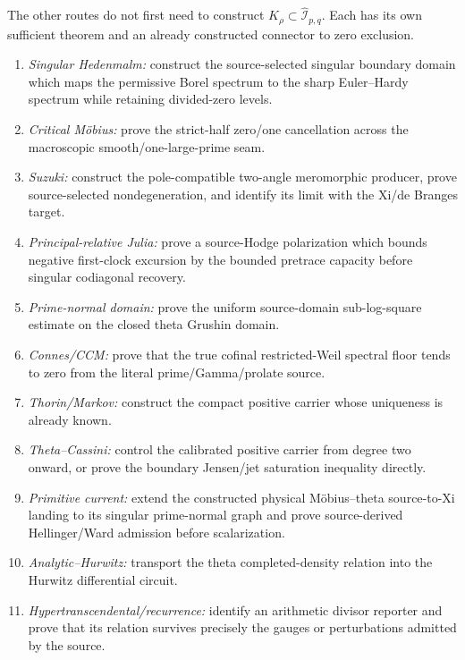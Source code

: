 \documentclass[11pt]{article}
\theoremstyle{definition}
\theoremstyle{remark}
\newcommand{\cI}{\mathcal I}
\begin{document}
The other routes do not first need to construct
\(K_\rho\subset\widehat{\cI}_{p,q}\).  Each has its own sufficient theorem
and an already constructed connector to zero exclusion.
\begin{enumerate}[leftmargin=2.2em]
\item \emph{Singular Hedenmalm:} construct the source-selected singular
      boundary domain which maps the permissive Borel spectrum to the
      sharp Euler--Hardy spectrum while retaining divided-zero levels.
\item \emph{Critical M\"obius:} prove the strict-half zero/one cancellation
      across the macroscopic smooth/one-large-prime seam.
\item \emph{Suzuki:} construct the pole-compatible two-angle meromorphic
      producer, prove source-selected nondegeneration, and identify its
      limit with the Xi/de Branges target.
\item \emph{Principal-relative Julia:} prove a source-Hodge polarization
      which bounds negative first-clock excursion by the bounded pretrace
      capacity before singular codiagonal recovery.
\item \emph{Prime-normal domain:} prove the uniform source-domain
      sub-log-square estimate on the closed theta Grushin domain.
\item \emph{Connes/CCM:} prove that the true cofinal restricted-Weil
      spectral floor tends to zero from the literal prime/Gamma/prolate
      source.
\item \emph{Thorin/Markov:} construct the compact positive carrier whose
      uniqueness is already known.
\item \emph{Theta--Cassini:} control the calibrated positive carrier from
      degree two onward, or prove the boundary Jensen/jet saturation
      inequality directly.
\item \emph{Primitive current:} extend the constructed physical
      M\"obius--theta source-to-Xi landing to its singular prime-normal
      graph and prove source-derived Hellinger/Ward admission before
      scalarization.
\item \emph{Analytic--Hurwitz:} transport the theta completed-density
      relation into the Hurwitz differential circuit.
\item \emph{Hypertranscendental/recurrence:} identify an arithmetic
      divisor reporter and prove that its relation survives precisely the
      gauges or perturbations admitted by the source.
\end{enumerate}
\end{document}
